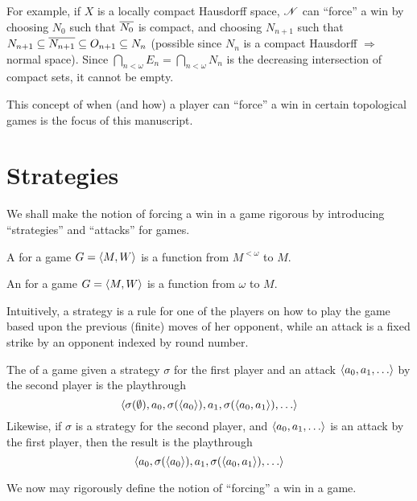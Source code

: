 For example, if $X$ is a locally compact Hausdorff space, $\mathscr{N}$ can ``force''
a win by choosing $N_0$ such that $\overline{N_0}$ is compact, and choosing
$N_{n+1}$ such that
$N_{n+1}\subseteq\overline{N_{n+1}}\subseteq O_{n+1}\subseteq N_n$
(possible since $N_n$ is a compact Hausdorff $\Rightarrow$ normal space).
Since $\bigcap_{n<\omega} E_n = \bigcap_{n<\omega} N_n$ is the decreasing
intersection of compact sets, it cannot be empty.

This concept of when (and how) a player can ``force'' a win in certain
topological games is the focus of this manuscript.



\section{Strategies}

We shall make the notion of forcing a win in a game rigorous by introducing
``strategies'' and ``attacks'' for games.

\begin{defn}
  A  for a game $G=\langle M,W\rangle$ is a function
  from $M^{<\omega}$ to $M$.
\end{defn}

\begin{defn}
  An  for a game $G=\langle M,W\rangle$ is a function
  from $\omega$ to $M$.
\end{defn}

Intuitively, a strategy is a rule for one of the players on how to play
the game based upon the previous (finite) moves of her opponent, while an
attack is a fixed strike by an opponent indexed by round number.


\begin{defn}
  The  of a game given a strategy $\sigma$ for the first player
  and an attack $\<a_0,a_1,\dots\>$ by the second player is the playthrough
    \[
      \<
        \sigma(\emptyset),
        a_0,
        \sigma(\<a_0\>),
        a_1,
        \sigma(\<a_0,a_1\>),
        \dots
      \>
    \]
  Likewise, if $\sigma$ is a strategy for the second player, and
  $\<a_0,a_1,\dots\>$ is an attack by the first player, then the result is
  the playthrough
    \[
      \<
        a_0,
        \sigma(\<a_0\>),
        a_1,
        \sigma(\<a_0,a_1\>),
        \dots
      \>
    \]
\end{defn}

We now may rigorously define the notion of ``forcing'' a win in a game.

